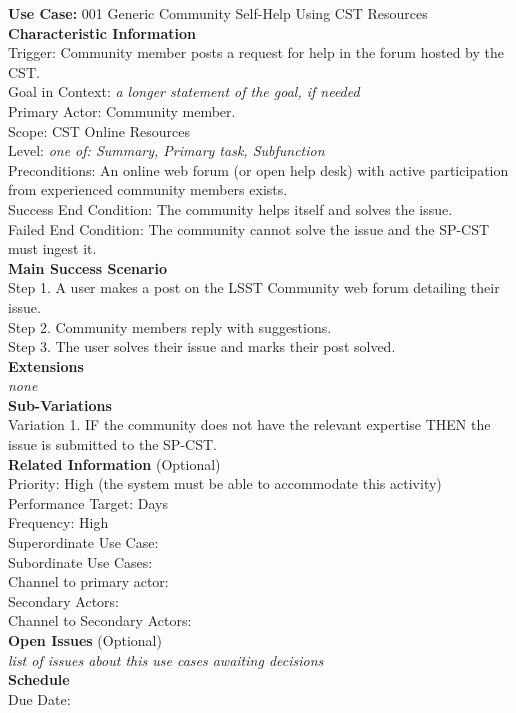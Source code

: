 {\bf Use Case:} 001 Generic Community Self-Help Using CST Resources \\

{\bf Characteristic Information} \\
Trigger: Community member posts a request for help in the forum hosted by the CST. \\
Goal in Context: {\it a longer statement of the goal, if needed} \\
Primary Actor: Community member. \\
Scope: CST Online Resources \\
Level: {\it one of: Summary, Primary task, Subfunction} \\
Preconditions: An online web forum (or open help desk) with active participation from experienced community members exists. \\
Success End Condition: The community helps itself and solves the issue. \\
Failed End Condition: The community cannot solve the issue and the SP-CST must ingest it. \\

{\bf Main Success Scenario} \\
Step 1. A user makes a post on the LSST Community web forum detailing their issue.\\
Step 2. Community members reply with suggestions.\\
Step 3. The user solves their issue and marks their post solved.\\

{\bf Extensions} \\
{\it none} \\

{\bf Sub-Variations} \\
Variation 1. IF the community does not have the relevant expertise THEN the issue is submitted to the SP-CST. \\

{\bf Related Information} (Optional) \\
Priority: High (the system must be able to accommodate this activity) \\
Performance Target: Days \\
Frequency: High \\
Superordinate Use Case:  \\
Subordinate Use Cases:  \\
Channel to primary actor:  \\
Secondary Actors:  \\
Channel to Secondary Actors:  \\

{\bf Open Issues} (Optional) \\
{\it list of issues about this use cases awaiting decisions} \\

{\bf Schedule} \\
Due Date: \\
